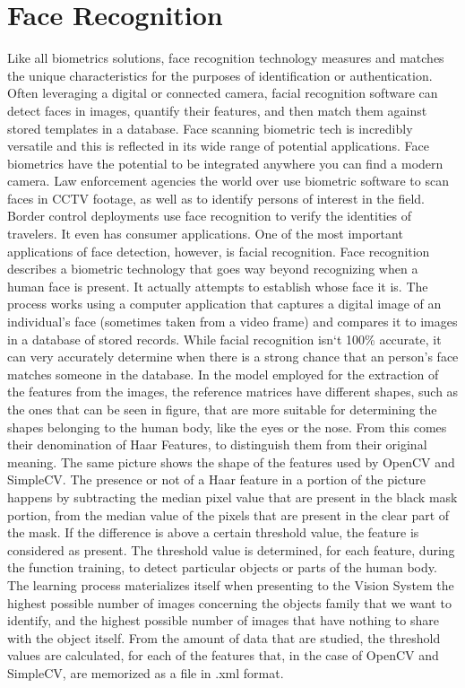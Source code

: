 \documentclass[sigconf]{acmart}
\begin{document}
\section{Face Recognition}
Like all biometrics solutions, face recognition technology measures and matches the unique characteristics for the purposes of identification or authentication. Often leveraging a digital or connected camera, facial recognition software can detect faces in images, quantify their features, and then match them against stored templates in a database.
Face scanning biometric tech is incredibly versatile and this is reflected in its wide range of potential applications.
Face biometrics have the potential to be integrated anywhere you can find a modern camera. Law enforcement agencies the world over use biometric software to scan faces in CCTV footage, as well as to identify persons of interest in the field. Border control deployments use face recognition to verify the identities of travelers. It even has consumer applications.
One of the most important applications of face detection, however, is facial recognition. Face recognition describes a biometric technology that goes way beyond recognizing when a human face is present. It actually attempts to establish whose face it is. The process works using a computer application that captures a digital image of an individual’s face (sometimes taken from a video frame) and compares it to images in a database of stored records. While facial recognition isn`t 100\% accurate, it can very accurately determine when there is a strong chance that an person’s face matches someone in the database.
In the model employed for the extraction of the features from the images, the reference matrices have different shapes, such as the ones that can be seen in figure, that are more suitable for determining the shapes belonging to the human body, like the eyes or the nose. From this comes their denomination of Haar Features, to distinguish them from their original meaning. The same picture shows the shape of the features used by OpenCV and SimpleCV. The presence or not of a Haar feature in a portion of the picture happens by subtracting the median pixel value that are present in the black  mask  portion, from the median value of the pixels that are present in the clear part of the mask. If the difference is above a certain threshold value, the feature is considered as present. The threshold value is determined, for each feature, during the function training, to detect particular objects or parts of the human body. The learning process materializes itself when presenting to the Vision System the highest possible number of images concerning the objects family that we want to identify, and the highest possible number of images that have nothing to share with the object itself. From the amount of data that are studied, the threshold values are calculated, for each of the features that, in the case of OpenCV and SimpleCV, are memorized as a file in .xml format.
\end{document}

